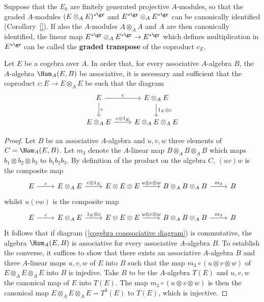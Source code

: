 \begin{remark}
Suppose that the $E_k$ are finitely generated projective $A$-modules, so that the graded $A$-modules $(E\otimes_AE)^{*\gr}$ and $E^{*\gr}\otimes_AE^{*\gr}$ can be canonically identified (Corollary~\ref{}). If also the $A$-modules $A\otimes_AA$ and $A$ are then canonically identified, the linear map $E^{*\gr}\otimes_AE^{*\gr}\to E^{*\gr}$ which defines multiplication in $E^{*\gr}$ can be called the \textbf{graded transpose} of the coproduct $c_E$.
\end{remark}
\begin{proposition}\label{cogebra coassociativity and dual}
Let $E$ be a cogebra over $A$. In order that, for every associative $A$-algebra $B$, the $A$-algebra $\Hom_A(E,B)$ be associative, it is necessary and sufficient that the coproduct $c:E\to E\otimes_AE$ be such that the diagram
\begin{equation}\label{cogebra coassociative diagram}
\begin{tikzcd}
E\ar[r,"c"]\ar[d,"c"]&E\otimes_AE\ar[d,"1_E\otimes c"]\\
E\otimes_AE\ar[r,"c\otimes 1_E"]&E\otimes_AE\otimes_AE
\end{tikzcd}
\end{equation}
\end{proposition}
\begin{proof}
Let $B$ be an associative $A$-algebra and $u,v,w$ three elements of $C=\Hom_A(E,B)$. Let $m_3$ denote the $A$-linear map $B\otimes_AB\otimes_AB$ which maps $b_1\otimes b_2\otimes b_3$ to $b_1b_2b_3$. By definition of the product on the algebra $C$, $(uv)w$ is the composite map
\[\begin{tikzcd}
E\ar[r,"c"]&E\otimes_AE\ar[r,"c\otimes 1_E"]&E\otimes E\otimes E\ar[r,"u\otimes v\otimes w"]&B\otimes_AB\otimes_AB\ar[r,"m_3"]&B
\end{tikzcd}\]
whilst $u(vw)$ is the composite map
\[\begin{tikzcd}
E\ar[r,"c"]&E\otimes_AE\ar[r,"1_E\otimes c"]&E\otimes E\otimes E\ar[r,"u\otimes v\otimes w"]&B\otimes_AB\otimes_AB\ar[r,"m_3"]&B
\end{tikzcd}\]
It follows that if diagram (\ref{cogebra coassociative diagram}) is commutative, the algebra $\Hom_A(E,B)$ is associative for every associative $A$-algebra $B$. To establish the converse, it suffices to show that there exists an associative $A$-algebra $B$ and three $A$-linear maps $u,v,w$ of $E$ into $B$ such that the map $m_3\circ(u\otimes v\otimes w)$ of $E\otimes_AE\otimes_AE$ into $B$ is injedive. Take $B$ to be the $A$-algebra $T(E)$ and $u,v,w$ the canonical map of $E$ into $T(E)$. The map $m_3\circ(u\otimes v\otimes w)$ is then the canonical map $E\otimes_AE\otimes_AE=T^3(E)$ to $T(E)$, which is injective.
\end{proof}
